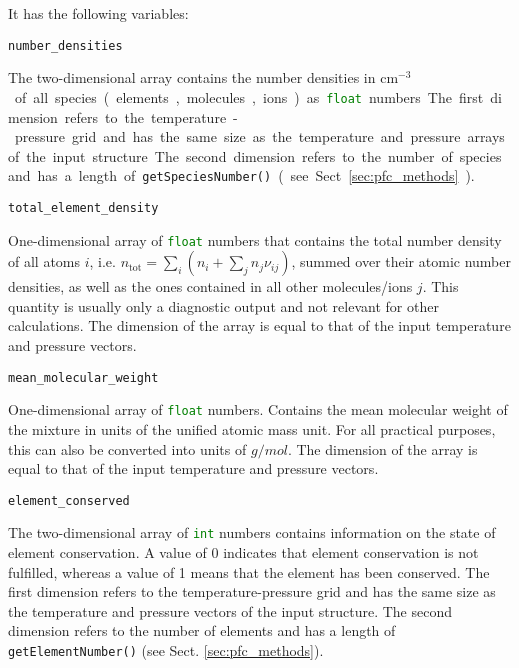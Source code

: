 \documentclass[numbers=noenddot]{aux/fcmanual}
\begin{document}
It has the following variables:

\lstinline!number_densities!
\begin{addmargin}[25pt]{0pt}
	The two-dimensional array contains the number densities in \unit{cm$^{-3}$} of all species (elements, molecules, ions) as \lstinline[language=Python]!float! numbers. The first dimension refers to the temperature-pressure grid and has the same size as the temperature and pressure arrays of the input structure. The second dimension refers to the number of species and has a length of \lstinline!getSpeciesNumber()! (see Sect. \ref{sec:pfc_methods}).
\end{addmargin}

\bigbreak

\lstinline!total_element_density!
\begin{addmargin}[25pt]{0pt}
	One-dimensional array of \lstinline[language=Python]!float! numbers that contains the total number density of all atoms $i$, i.e. $n_\mathrm{tot} = \sum_i \left( n_i + \sum_j n_j \nu_{ij} \right)$, summed over their atomic number densities, as well as the ones contained in all other molecules/ions $j$. This quantity is usually only a diagnostic output and not relevant for other calculations. The dimension of the array is equal to that of the input temperature and pressure vectors.
\end{addmargin}

\bigbreak

\lstinline!mean_molecular_weight!
\begin{addmargin}[25pt]{0pt}
	One-dimensional array of \lstinline[language=Python]!float! numbers. Contains the mean molecular weight of the mixture in units of the unified atomic mass unit. For all practical purposes, this can also be converted into units of $\unit{g/mol}$. The dimension of the array is equal to that of the input temperature and pressure vectors.
\end{addmargin}

\bigbreak

\lstinline!element_conserved!
\begin{addmargin}[25pt]{0pt}
	The two-dimensional array of \lstinline[language=Python]!int! numbers contains information on the state of element conservation. A value of 0 indicates that element conservation is not fulfilled, whereas a value of 1 means that the element has been conserved. The first dimension refers to the temperature-pressure grid and has the same size as the temperature and pressure vectors of the input structure. The second dimension refers to the number of elements and has a length of \lstinline!getElementNumber()! (see Sect. \ref{sec:pfc_methods}).
\end{addmargin}
\end{document}
